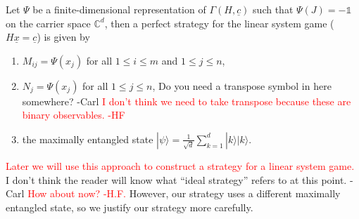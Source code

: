 \documentclass[11pt,letterpaper]{article}
\newcommand{\ket}[1]{|#1\rangle}
\newcommand{\C}{\mathbb{C}}
\newcommand{\1}{\mathbb{1}}
\newcommand{\ux}{\underline{x}}
\newcommand{\uc}{\underline{c}}
\newcommand{\sd}{\sqrt{d}}
\def\carl#1{{\color{blue} #1 -Carl}}
\newcommand{\hf}[1]{\textcolor{red}{#1}}
\newcommand{\hfc}[1]{\textcolor{red}{#1 -H.F.}}
\theoremstyle{definition}
\begin{document}
Let $\Psi$ be a finite-dimensional representation of $\Gamma(H,\uc)$ such that $\Psi(J) = -\1$ on the carrier space $\C^d$, then a perfect strategy for 
the linear system game ($H\ux = \uc$) is given by 
\begin{enumerate}
	\item $M_{ij} = \Psi(x_j)$ for all $ 1 \leq i \leq m$ and $1 \leq j \leq n$,
	\item $N_j = \Psi(x_j)$ for all $1 \leq j \leq n$, \carl{Do you need a transpose symbol in here somewhere?}
	\hf{I don't think we need to take transpose because these are binary observables. -HF}
	\item the maximally entangled state $\ket{\psi} = \frac{1}{\sd} \sum_{k=1}^d \ket{k}\ket{k}$.
\end{enumerate}
\hf{Later we will use this approach to construct a strategy for a linear system game.}
\carl{I don't think the reader will know what ``ideal strategy'' refers to at this point.}
\hfc{How about now?}
However, our strategy uses a different maximally entangled state,
so we justify our strategy more carefully.

\end{document}
